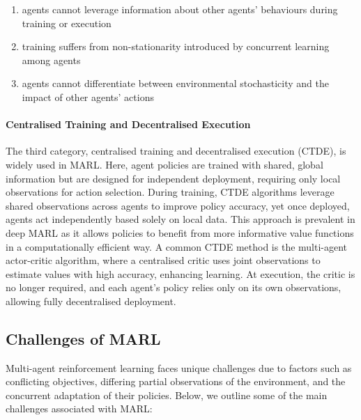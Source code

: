 \documentclass{article}
\begin{document}
\begin{enumerate}
	\item agents cannot leverage information about other agents’ behaviours during training or execution
	\item training suffers from non-stationarity introduced by concurrent learning among agents
	\item agents cannot differentiate between environmental stochasticity and the impact of other agents’ actions
\end{enumerate}

\paragraph{Centralised Training and Decentralised Execution} The third category, centralised training and decentralised execution (CTDE), is widely used in MARL. Here, agent policies are trained with shared, global information but are designed for independent deployment, requiring only local observations for action selection. During training, CTDE algorithms leverage shared observations across agents to improve policy accuracy, yet once deployed, agents act independently based solely on local data. This approach is prevalent in deep MARL as it allows policies to benefit from more informative value functions in a computationally efficient way. A common CTDE method is the multi-agent actor-critic algorithm, where a centralised critic uses joint observations to estimate values with high accuracy, enhancing learning. At execution, the critic is no longer required, and each agent’s policy relies only on its own observations, allowing fully decentralised deployment.


\subsection{Challenges of MARL}

Multi-agent reinforcement learning faces unique challenges due to factors such as conflicting objectives, differing partial observations of the environment, and the concurrent adaptation of their policies. Below, we outline some of the main challenges associated with MARL:
\end{document}
